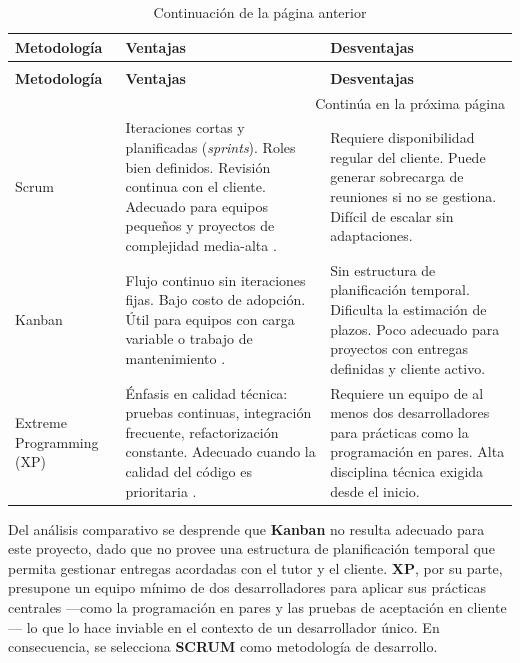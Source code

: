 \begin{longtable}[c]{|p{2.3cm}|p{5.5cm}|p{5.3cm}|}
\caption{Comparativa de metodologías ágiles}
\label{tb:metodologias_agiles}\\
\hline
\textbf{Metodología} & \textbf{Ventajas} & \textbf{Desventajas} \\
\hline
\endfirsthead
\caption[]{Continuación de la página anterior} \\
\hline
\textbf{Metodología} & \textbf{Ventajas} & \textbf{Desventajas} \\
\hline
\endhead
\multicolumn{3}{r}{{Continúa en la próxima página}} \\
\endfoot
\hline
\endlastfoot

Scrum &
Iteraciones cortas y planificadas (\textit{sprints}). Roles bien definidos. Revisión continua con
el cliente. Adecuado para equipos pequeños y proyectos de complejidad media-alta
\citep{Schwaber2020}. &
Requiere disponibilidad regular del cliente. Puede generar sobrecarga de reuniones si no se
gestiona. Difícil de escalar sin adaptaciones. \\ \hline

Kanban &
Flujo continuo sin iteraciones fijas. Bajo costo de adopción. Útil para equipos con carga variable
o trabajo de mantenimiento \citep{Pressman2021}. &
Sin estructura de planificación temporal. Dificulta la estimación de plazos. Poco adecuado para
proyectos con entregas definidas y cliente activo. \\ \hline

Extreme Programming (XP) &
Énfasis en calidad técnica: pruebas continuas, integración frecuente, refactorización constante.
Adecuado cuando la calidad del código es prioritaria \citep{Pressman2021}. &
Requiere un equipo de al menos dos desarrolladores para prácticas como la programación en pares.
Alta disciplina técnica exigida desde el inicio. \\ \hline

\end{longtable}

Del análisis comparativo se desprende que \textbf{Kanban} no resulta adecuado para este proyecto,
dado que no provee una estructura de planificación temporal que permita gestionar entregas acordadas
con el tutor y el cliente. \textbf{XP}, por su parte, presupone un equipo mínimo de dos
desarrolladores para aplicar sus prácticas centrales ---como la programación en pares y las pruebas
de aceptación en cliente--- lo que lo hace inviable en el contexto de un desarrollador único. En
consecuencia, se selecciona \textbf{SCRUM} como metodología de desarrollo.

